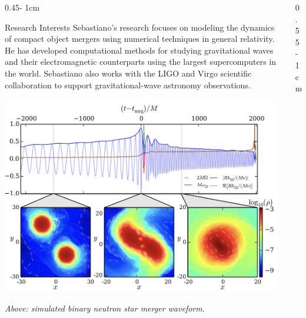 \documentclass{../psuposter}
\begin{document}
\begin{frame}
\begin{columns}
\begin{column}{0.45\textwidth - 1cm}
    \begin{block}{Research Interests}
        Sebastiano's research focuses on modeling the dynamics of compact object mergers using numerical techniques in general relativity. He has developed computational methods for studying gravitational waves and their electromagnetic counterparts using the largest supercomputers in the world. Sebastiano also works with the LIGO and Virgo scientific collaboration to support gravitational-wave astronomy observations. 
        \begin{center}
	    	\includegraphics[width=0.98\textwidth]{images/bernuzzi-merger}    		
    	\end{center}
    	\textit{Above: simulated binary neutron star merger waveform}. \cite{bernuzziModelingCompleteGravitational2015}
    \end{block}
\end{column}

\begin{column}{0.55\textwidth - 1cm}



\end{column}
\end{columns}
\end{frame}
\end{document}
